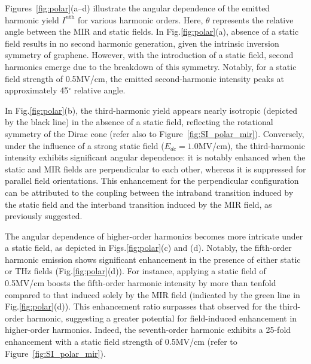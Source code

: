 Figures~\ref{fig:polar}(a--d) illustrate the angular dependence of the emitted harmonic yield $I^{n \textrm{th}}$ for various harmonic orders. Here, $\theta$ represents the relative angle between the MIR and static fields. In Fig.\ref{fig:polar}(a), absence of a static field results in no second harmonic generation, given the intrinsic inversion symmetry of graphene. However, with the introduction of a static field, second harmonics emerge due to the breakdown of this symmetry. Notably, for a static field strength of 0.5MV/cm, the emitted second-harmonic intensity peaks at approximately 45$^{\circ}$ relative angle.

In Fig.\ref{fig:polar}(b), the third-harmonic yield appears nearly isotropic (depicted by the black
line) in the absence of a static field, reflecting the rotational symmetry of the Dirac cone (refer
also to Figure~\ref{fig:SI_polar_mir}). Conversely, under the influence of a strong static field ($E_{dc}=1.0$MV/cm), the third-harmonic intensity exhibits significant angular dependence: it is notably enhanced when the static and MIR fields are perpendicular to each other, whereas it is suppressed for parallel field orientations. This enhancement for the perpendicular configuration can be attributed to the coupling between the intraband transition induced by the static field and the interband transition induced by the MIR field, as previously suggested\cite{PhysRevB.103.L041408}.

The angular dependence of higher-order harmonics becomes more intricate under a static field, as
depicted in Figs.\ref{fig:polar}(c) and (d). Notably, the fifth-order harmonic emission shows
significant enhancement in the presence of either static or THz fields (Fig.\ref{fig:polar}(d)).
For instance, applying a static field of 0.5MV/cm boosts the fifth-order harmonic intensity by more
than tenfold compared to that induced solely by the MIR field (indicated by the green line in
Fig.\ref{fig:polar}(d)). This enhancement ratio surpasses that observed for the third-order
harmonic, suggesting a greater potential for field-induced enhancement in higher-order harmonics.
Indeed, the seventh-order harmonic exhibits a 25-fold enhancement with a static field strength of
0.5MV/cm (refer to Figure~\ref{fig:SI_polar_mir}).

